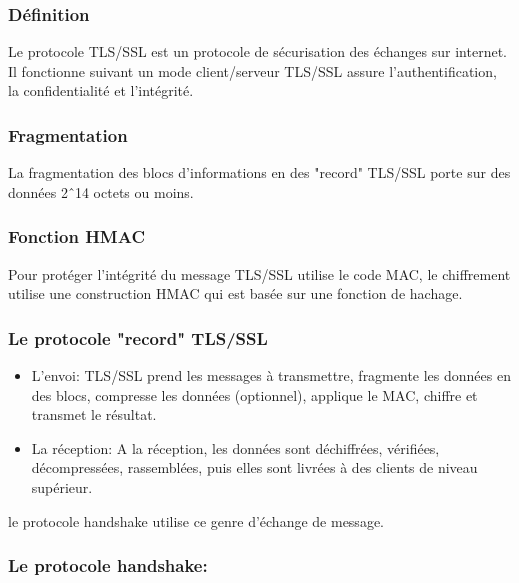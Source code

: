 \subsubsection{Définition}
Le protocole TLS/SSL est un protocole de sécurisation des échanges sur internet. Il fonctionne suivant un mode client/serveur
TLS/SSL assure l'authentification, la confidentialité et l'intégrité.
\subsubsection{Fragmentation}
La fragmentation des blocs d'informations en des "record" TLS/SSL porte sur des données 2\^\ 14 octets ou moins.
\subsubsection{Fonction HMAC}
Pour protéger l'intégrité du message TLS/SSL utilise le code MAC,
le chiffrement utilise une construction HMAC qui est basée sur une fonction de hachage.
\subsubsection{Le protocole "record" TLS/SSL}
\begin{itemize}
\item L'envoi:
TLS/SSL prend les messages à transmettre, fragmente les données en des blocs, compresse les données (optionnel), applique le MAC, chiffre et transmet le résultat. 
\item
La réception:
A la réception, les données sont déchiffrées, vérifiées, décompressées, rassemblées, puis elles sont livrées à des clients de niveau supérieur.
\end{itemize}
le protocole handshake utilise ce genre d'échange de message.
\subsubsection{Le protocole handshake:}

